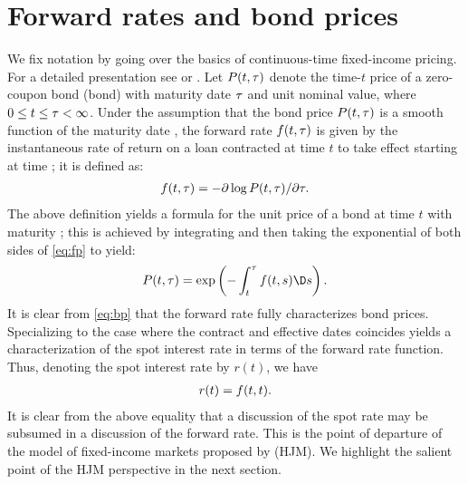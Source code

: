 \section{Forward rates and bond prices}
We fix notation by going over the basics of continuous-time fixed-income pricing. For a detailed presentation see  \cite{Carmona2006} or \cite{Heath1992}.  Let $P(t,\tau)$ denote the time-$t$ price of a zero-coupon bond (bond) with maturity date $\tau$ and unit nominal value, where $0\le t\le \tau < \infty$. Under the assumption that the bond price $P(t,\tau)$ is a smooth function of the maturity date \T,  the forward rate $f(t,\tau)$ is given by the instantaneous rate of return on a loan contracted at time $t$ to take effect starting at time \T; it is defined as:
\begin{align}
  f(t,\tau) = -\partial \log P(t, \tau)/\partial \tau .
  \label{eq:fp}
\end{align}
The above definition yields a formula for the unit price of a bond at time $t$ with maturity \T; this is achieved by  integrating and then taking the exponential of  both sides of \eqref{eq:fp} to yield:
\begin{align}
  P(t, \T) = \exp \left(-\int_t^\T f(t,s) \D s \right).
  \label{eq:bp}
\end{align}
It is  clear from \eqref{eq:bp} that the forward rate fully characterizes bond prices. Specializing to the case where the contract and effective dates coincides yields a characterization of the spot interest rate in terms of the forward rate function. Thus, denoting the spot interest rate by $r(t)$, we have
\begin{align}
  r(t) = f(t,t).\notag
  \label{}
\end{align}
It is  clear from the above equality that a discussion of the spot rate may be subsumed in a discussion of the forward rate. This is the point of departure of the model of fixed-income markets proposed by \cite{Heath1992} (HJM). We highlight the salient point of the HJM perspective in the next section. 
